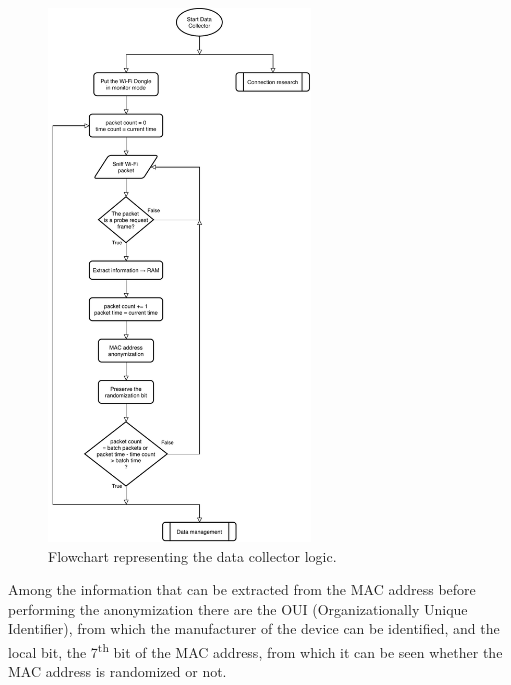 \begin{figure}[h!]
\centering 
\includegraphics[width=0.62\textwidth]{images/flowcollect} 
\caption{Flowchart representing the data collector logic.}
\label{fig:flowcollect}
\end{figure}


Among the information that can be extracted from the MAC address before performing the anonymization there are the OUI (Organizationally Unique Identifier), from which the manufacturer of the device can be identified, and the local bit, the 7\textsuperscript{th} bit of the MAC address, from which it can be seen whether the MAC address is randomized or not.

